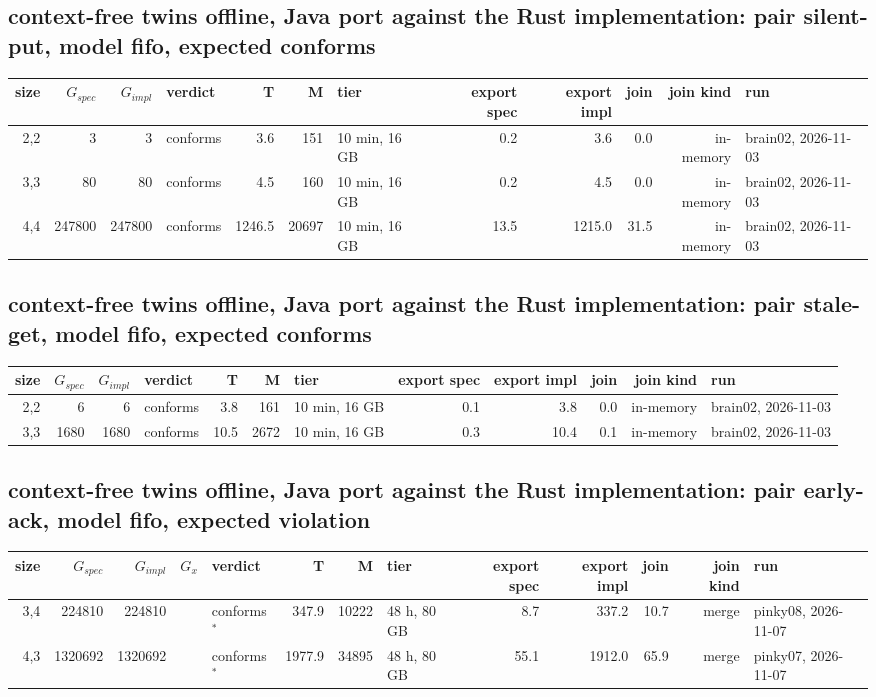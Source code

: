 \documentclass[10pt]{article}
\begin{document}
\subsection*{context-free twins offline, Java port against the Rust implementation: pair \textsf{silent-put}, model fifo, expected conforms}
\begin{longtable}{@{}rrrlrrlrrrrl@{}}
\toprule
size & $G_{\mathit{spec}}$ & $G_{\mathit{impl}}$ & verdict & T & M & tier & export spec & export impl & join & join kind & run \\
\midrule
\endhead
\color{red} 2,2 & 3 & 3 & conforms & 3.6 & 151 & 10 min, 16 GB & 0.2 & 3.6 & 0.0 & in-memory & brain02, 2026-11-03 \\
\color{red} 3,3 & 80 & 80 & conforms & 4.5 & 160 & 10 min, 16 GB & 0.2 & 4.5 & 0.0 & in-memory & brain02, 2026-11-03 \\
\color{red} 4,4 & 247800 & 247800 & conforms & 1246.5 & 20697 & 10 min, 16 GB & 13.5 & 1215.0 & 31.5 & in-memory & brain02, 2026-11-03 \\
\bottomrule
\end{longtable}
\subsection*{context-free twins offline, Java port against the Rust implementation: pair \textsf{stale-get}, model fifo, expected conforms}
\begin{longtable}{@{}rrrlrrlrrrrl@{}}
\toprule
size & $G_{\mathit{spec}}$ & $G_{\mathit{impl}}$ & verdict & T & M & tier & export spec & export impl & join & join kind & run \\
\midrule
\endhead
\color{red} 2,2 & 6 & 6 & conforms & 3.8 & 161 & 10 min, 16 GB & 0.1 & 3.8 & 0.0 & in-memory & brain02, 2026-11-03 \\
\color{red} 3,3 & 1680 & 1680 & conforms & 10.5 & 2672 & 10 min, 16 GB & 0.3 & 10.4 & 0.1 & in-memory & brain02, 2026-11-03 \\
\bottomrule
\end{longtable}
\subsection*{context-free twins offline, Java port against the Rust implementation: pair \textsf{early-ack}, model fifo, expected violation}
\begin{longtable}{@{}rrrrlrrlrrrrl@{}}
\toprule
size & $G_{\mathit{spec}}$ & $G_{\mathit{impl}}$ & $G_x$ & verdict & T & M & tier & export spec & export impl & join & join kind & run \\
\midrule
\endhead
\color{red} 3,4 & 224810 & 224810 &  & conforms$^{\ast}$ & 347.9 & 10222 & 48 h, 80 GB & 8.7 & 337.2 & 10.7 & merge & pinky08, 2026-11-07 \\
\color{red} 4,3 & 1320692 & 1320692 &  & conforms$^{\ast}$ & 1977.9 & 34895 & 48 h, 80 GB & 55.1 & 1912.0 & 65.9 & merge & pinky07, 2026-11-07 \\
\bottomrule
\end{longtable}
\end{document}
